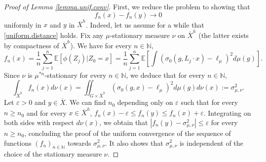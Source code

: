 \documentclass[JEP,XML,SOM,Unicode,published]{cedram}
\let\epsilon\varepsilon
\let\ts\textstyle
\theoremstyle{plain}
\theoremstyle{definition}
\newcommand\E{\mathbb{E}}
\newcommand\N{\mathbb{N}}
\begin{document}
\begin{proof}[Proof of Lemma \ref{lemma.unif.conv}]
First, we reduce the problem to showing that \begin{equation}\label{uniform.distance}
f_n(x)-f_n(y)\to 0
\end{equation}
uniformly in $x$ and $y$ in $\overline{X}^h$. Indeed, let us assume for a while that \eqref{uniform.distance} holds. Fix any $\mu$-stationary measure $\nu$ on $\overline{X}^h$ (the latter exists by compactness of $\overline{X}^h$). We have for every $n\in \N$,
\begin{equation}\label{expression}f_n(x)=\frac{1}{n}\sum_{j=1}^n{\E[\phi(Z_j)| Z_0=x]}
= \frac{1}{n}\sum_{j=1}^n{\E[\ts\int{(\sigma_0(g, L_{j} \cdot x)-\ell_{\mu})^2 d\mu(g)}]}.
\end{equation}
Since $\nu$ is $\mu^{\ast n}$-stationary for every $n\in \N$, we deduce that for every $n\in \N$,
\[
\int_{\overline{X}^h}{f_n(x) d\nu(x)}=
\iint_{G\times \overline{X}^h}{(\sigma_0(g,x) - \ell_{\mu})^2 d\mu(g) d\nu(x)}:=\sigma^2_{\mu,\nu}.
\]
Let $\epsilon>0$ and $y\in \overline{X}$. We can find $n_0$ depending only on $\epsilon$ such that for every $n\geq n_0$ and for every $x\in \overline{X}^h$, $f_n(x)-\epsilon\leq f_n(y)\leq f_n(x)+\epsilon$. Integrating on both sides with respect $d\nu(x)$, we obtain that $|f_n(y)-\sigma_{\mu,\nu}^2|\leq \epsilon$ for every $n\geq n_0$, concluding the proof of the uniform convergence of the sequence of functions $(f_n)_{n\in \N}$ towards $\sigma_{\mu,\nu}^2$. It also shows that $\sigma^2_{\mu, \nu}$ is independent of the choice of the stationary measure $\nu$.


\end{proof}
\end{document}

